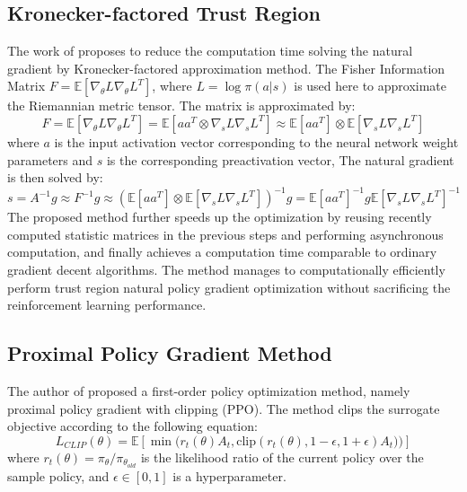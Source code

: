 \subsection{Kronecker-factored Trust Region}
The work of \cite{wu2017scalable} proposes to reduce the computation time solving the natural gradient by Kronecker-factored approximation method.
The Fisher Information Matrix $F=\mathbb{E}[\nabla_\theta L \nabla_\theta L^T]$, where $L=\log\pi(a|s)$ is used here to approximate the Riemannian metric tensor.
The matrix is approximated by:
\begin{equation*}
    F=\mathbb{E}[\nabla_\theta L \nabla_\theta L^T] = \mathbb{E}[aa^T \otimes \nabla_s L \nabla_s L^T ] 
    \approx \mathbb{E}[aa^T] \otimes \mathbb{E}[\nabla_s L \nabla_s L^T ] 
\end{equation*}
where $a$ is the input activation vector corresponding to the neural network weight parameters and $s$ is the corresponding preactivation vector,
The natural gradient is then solved by:
\begin{equation}
    s=A^{-1}g \approx F^{-1}g \approx \left(\mathbb{E}[aa^T] \otimes \mathbb{E}[\nabla_s L \nabla_s L^T ] \right)^{-1}g = \mathbb{E}[aa^T]^{-1} g  \mathbb{E}[\nabla_s L \nabla_s L^T ]^{-1}
\end{equation}
The proposed method further speeds up the optimization by reusing recently computed statistic matrices in the previous steps and performing asynchronous computation, and finally achieves a computation time comparable to ordinary gradient decent algorithms.
The method manages to computationally efficiently perform trust region natural policy gradient optimization without sacrificing the reinforcement learning performance.

\subsection{Proximal Policy Gradient Method}
The author of \cite{schulman2017proximal} proposed a first-order policy optimization method, namely proximal policy gradient with clipping (PPO). The method clips the surrogate objective according to the following equation:
\begin{equation}
    L_{CLIP}(\theta) = \mathbb{E} \left[ \min\big(r_t(\theta) A_t , \mathrm{clip}(r_t(\theta),1-\epsilon,1+\epsilon)A_t)\big) \right]
\end{equation}
where $r_t(\theta) = \pi_\theta / \pi_{\theta_{old}}$ is the likelihood ratio of the current policy over the sample policy, and $\epsilon \in [0,1]$ is a hyperparameter. 

